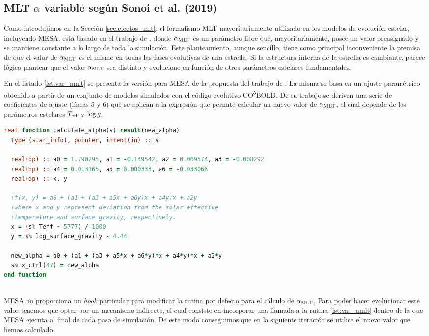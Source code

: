 \subsection{MLT $\alpha$ variable según Sonoi et al. (2019)}
Como introdujimos en la Sección \ref{sec:efectos_mlt}, el formalismo MLT mayoritariamente utilizado en los modelos de evolución estelar, incluyendo MESA, está basado en el trabajo de \cite{BohmVit58}, donde $\alpha_{\mathrm{MLT}}$ es un parámetro libre que, mayoritariamente, posee un valor preasignado y se mantiene constante a lo largo de toda la simulación. Este planteamiento, aunque sencillo, tiene como principal inconveniente la premisa de que el valor de $\alpha_{\mathrm{MLT}}$ es el mismo en todas las fases evolutivas de una estrella. Si la estructura interna de la estrella es cambiante, parece lógico plantear que el valor $\alpha_{\mathrm{MLT}}$ sea distinto y evolucione en función de otros parámetros estelares fundamentales.\par

En el listado \ref{lst:var_amlt} se presenta la versión para MESA de la propuesta del trabajo de \cite{Sonoi2018}. La misma se basa en un ajuste paramétrico obtenido a partir de un conjunto de modelos simulados con el código evolutivo CO\textsuperscript{5}BOLD. De su trabajo se derivan una serie de coeficientes de ajuste (líneas 5 y 6) que se aplican a la expresión que permite calcular un nuevo valor de $\alpha_{\mathrm{MLT}}$, el cual depende de los parámetros estelares $T_{\mathrm{eff}}$ y $\mathrm{log} \, g$.\par

\begin{lstlisting}[language=Fortran, float, caption={Rutina de $\amlt$ variable.}, label={lst:var_amlt}]
real function calculate_alpha(s) result(new_alpha)
  type (star_info), pointer, intent(in) :: s
		
  real(dp) :: a0 = 1.790295, a1 = -0.149542, a2 = 0.069574, a3 = -0.008292
  real(dp) :: a4 = 0.013165, a5 = 0.080333, a6 = -0.033066
  real(dp) :: x, y
	
  !f(x, y) = a0 + (a1 + (a3 + a5x + a6y)x + a4y)x + a2y
  !where x and y represent deviation from the solar effective 
  !temperature and surface gravity, respectively.
  x = (s% Teff - 5777) / 1000
  y = s% log_surface_gravity - 4.44
	
  new_alpha = a0 + (a1 + (a3 + a5*x + a6*y)*x + a4*y)*x + a2*y
  s% x_ctrl(47) = new_alpha
end function
	
\end{lstlisting}

MESA no proporciona un \textit{hook} particular para modificar la rutina por defecto para el cálculo de $\alpha_{\mathrm{MLT}}$. Para poder hacer evolucionar este valor tenemos que optar por un mecanismo indirecto, el cual consiste en incorporar una llamada a la rutina \ref{lst:var_amlt} dentro de la que MESA ejecuta al final de cada paso de simulación. De este modo conseguimos que en la siguiente iteración se utilice el nuevo valor que hemos calculado.\par

